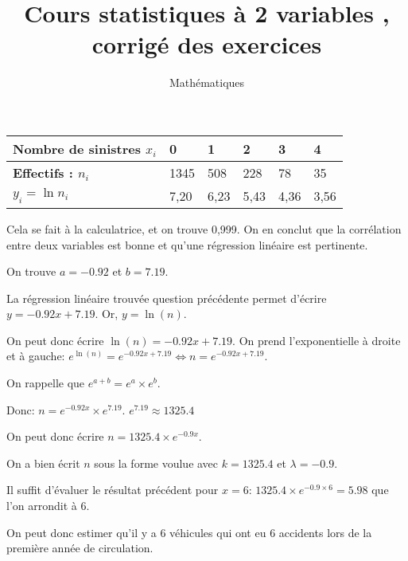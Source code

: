\documentclass[a4paper,12pt]{scrartcl}
\date{}
\title{Cours \og statistiques à 2 variables \fg{}, corrigé des exercices}
\author{Mathématiques}
\begin{document}
\maketitle



\begin{tabular}{@{}|l|l|l|l|l|l|@{}}
\toprule
\textbf{Nombre de sinistres $x_i$} & \textbf{0} & \textbf{1} & \textbf{2} & \textbf{3} & \textbf{4} \\ \midrule
\textbf{Effectifs : $n_i$} & 1345 & 508 & 228 & 78 & 35 \\ \midrule
\textbf{$y_i= \ln n_i$} & 7,20 & 6,23 & 5,43 & 4,36 & 3,56 \\ \bottomrule
\end{tabular}


Cela se fait à la calculatrice, et on trouve 0,999. On en conclut que la corrélation entre deux variables est bonne et qu'une régression linéaire est pertinente.


On trouve $a = -0.92$ et $b = 7.19$.


La régression linéaire trouvée question précédente permet d'écrire $y = -0.92x + 7.19$. Or, $y = \ln(n)$.

On peut donc écrire $\ln(n) = -0.92x + 7.19$. On prend l'exponentielle à droite et à gauche: $e^{\ln(n)} = e^{-0.92x + 7.19} \Leftrightarrow n = e^{-0.92x + 7.19}$.

On rappelle que $e^{a+b} = e^a \times e^b$.

Donc: $n = e^{-0.92x} \times e^{7.19}$. $e^{7.19} \approx 1325.4$

On peut donc écrire $n = 1325.4 \times e^{-0.9x}$.

On a bien écrit $n$ sous la forme voulue avec $k = 1325.4$ et $\lambda = -0.9$.


Il suffit d'évaluer le résultat précédent pour $x = 6$: $1325.4 \times e^{-0.9 \times 6} = 5.98$ que l'on arrondit à 6. 

On peut donc estimer qu'il y a 6 véhicules qui ont eu 6 accidents lors de la première année de circulation.

\end{document}
